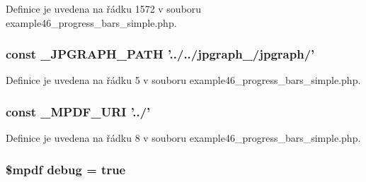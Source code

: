 Definice je uvedena na řádku 1572 v souboru example46\-\_\-progress\-\_\-bars\-\_\-simple.\-php.

\hypertarget{example46__progress__bars__simple_8php_aa256b12517ab22b9550c150865a689c4}{
\subsubsection[{\-\_\-\-J\-P\-G\-R\-A\-P\-H\-\_\-\-P\-A\-T\-H}]{\setlength{\rightskip}{0pt plus 5cm}const \-\_\-\-J\-P\-G\-R\-A\-P\-H\-\_\-\-P\-A\-T\-H '../../jpgraph\-\_/jpgraph/'}}\label{example46__progress__bars__simple_8php_aa256b12517ab22b9550c150865a689c4}


Definice je uvedena na řádku 5 v souboru example46\-\_\-progress\-\_\-bars\-\_\-simple.\-php.

\hypertarget{example46__progress__bars__simple_8php_a1ff50e3d84f8270d034f2e9d99c147c0}{
\subsubsection[{\-\_\-\-M\-P\-D\-F\-\_\-\-U\-R\-I}]{\setlength{\rightskip}{0pt plus 5cm}const \-\_\-\-M\-P\-D\-F\-\_\-\-U\-R\-I '../'}}\label{example46__progress__bars__simple_8php_a1ff50e3d84f8270d034f2e9d99c147c0}


Definice je uvedena na řádku 8 v souboru example46\-\_\-progress\-\_\-bars\-\_\-simple.\-php.

\hypertarget{example46__progress__bars__simple_8php_a200a436f1833a712239f1ae5bec608db}{
\subsubsection[{debug}]{\setlength{\rightskip}{0pt plus 5cm}\$mpdf debug = true}}\label{example46__progress__bars__simple_8php_a200a436f1833a712239f1ae5bec608db}


